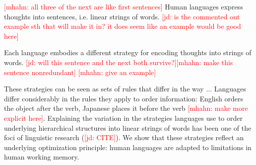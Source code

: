 \documentclass[12pt]{article}
\newcommand{\jd}[1]{\textcolor{Red}{[jd: #1]}}
\newcommand{\mhahn}[1]{\textcolor{Red}{[mhahn: #1]}}
\begin{document}





\mhahn{all three of the next are like first sentences}
Human languages express thoughts into sentences, i.e. linear strings of words. 
\jd{is the commented out example sth that will make it in? it does seem like an example would be good here}

Each language embodies a different strategy for encoding thoughts into strings of words. \jd{will this sentence and the next both survive?}\mhahn{make this sentence nonredundant}
\mhahn{give an example}

These strategies can be seen as sets of rules that differ in the way ...
Languages differ considerably in the rules they apply to order information: English orders the object after the verb, Japanese places it before the verb \mhahn{make more explicit here}.
Explaining the variation in the strategies languages use to  order underlying hierarchical structures into linear strings of words has been one of the foci of linguistic research (\jd{CITE}).
We show that these strategies reflect an underlying optimization principle: human languages are adapted to limitations in human working memory.
\end{document}
